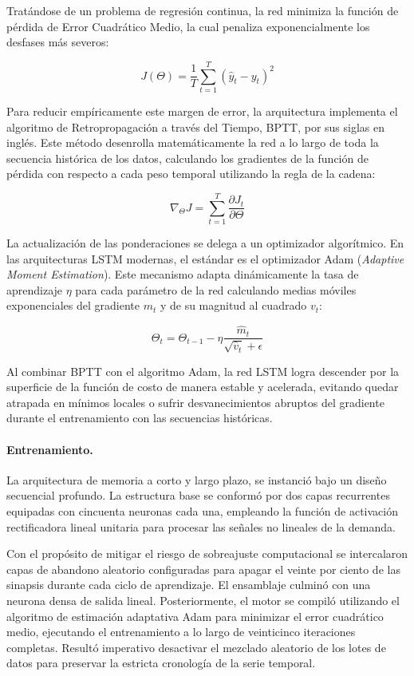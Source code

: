 \documentclass[11pt,a4paper]{report}
\begin{document}
            Tratándose de un problema de regresión continua, la red minimiza la función de pérdida de Error Cuadrático Medio, la cual penaliza
            exponencialmente los desfases más severos:
            
            $$J(\Theta)=\frac{1}{T}\sum_{t=1}^{T}(\hat{y}_{t}-y_{t})^{2}$$
            
            Para reducir empíricamente este margen de error, la arquitectura implementa el algoritmo de Retropropagación a través del Tiempo, BPTT, por sus siglas en inglés.
            Este método desenrolla matemáticamente la red a lo largo de toda la secuencia histórica de los datos, calculando los gradientes de la función de pérdida con
            respecto a cada peso temporal utilizando la regla de la cadena:
            
            $$\nabla_{\Theta} J = \sum_{t=1}^{T} \frac{\partial J_{t}}{\partial \Theta}$$
            
            La actualización de las ponderaciones se delega a un optimizador algorítmico. En las arquitecturas LSTM modernas, el estándar es el optimizador
            Adam (\textit{Adaptive Moment Estimation}). Este mecanismo adapta dinámicamente la tasa de aprendizaje $\eta$ para cada parámetro de la red
            calculando medias móviles exponenciales del gradiente $m_{t}$ y de su magnitud al cuadrado $v_{t}$:
            
            $$\Theta_{t}=\Theta_{t-1}-\eta\frac{\hat{m}_{t}}{\sqrt{\hat{v}_{t}}+\epsilon}$$
            
            Al combinar BPTT con el algoritmo Adam, la red LSTM logra descender por la superficie de la función de costo de manera estable y acelerada, evitando quedar atrapada en mínimos locales o sufrir desvanecimientos abruptos del gradiente durante el entrenamiento con las secuencias históricas.

            \paragraph{Entrenamiento.}
            La arquitectura de memoria a corto y largo plazo, se instanció bajo un diseño secuencial profundo.
            La estructura base se conformó por dos capas recurrentes equipadas con cincuenta neuronas cada una, empleando
            la función de activación rectificadora lineal unitaria para procesar las señales no lineales de la demanda. 

            Con el propósito de mitigar el riesgo de sobreajuste computacional se intercalaron capas de abandono aleatorio configuradas
            para apagar el veinte por ciento de las sinapsis durante cada ciclo de aprendizaje. El ensamblaje culminó con una neurona densa
            de salida lineal. Posteriormente, el motor se compiló utilizando el algoritmo de estimación adaptativa Adam para minimizar el
            error cuadrático medio, ejecutando el entrenamiento a lo largo de veinticinco iteraciones completas. Resultó imperativo desactivar
            el mezclado aleatorio de los lotes de datos para preservar la estricta cronología de la serie temporal.
\end{document}
